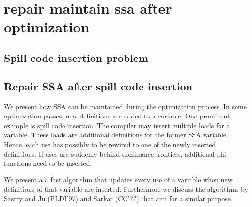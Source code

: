\applynumberofpages\chapter{repair maintain ssa after optimization }

\section{Spill code insertion problem}
\section{Repair SSA after spill code insertion}
We present how SSA can be maintained during the optimization process. 
In some optimization passes, new definitions are added to a variable.
One prominent example is spill code insertion:
The compiler may insert multiple loads for a variable.
These loads are additional definitions for the former SSA variable.
Hence, each use has possibly to be rewired to one of the newly inserted definitions.
If uses are suddenly behind dominance frontiers, additional phi-functions need to be inserted.

We present a a fast algorithm that updates every use of a variable when new definitions of that variable are inserted.
Furthermore we discuss the algorithms by Sastry and Ju (PLDI'97) and Sarkar (CC'??) that aim for a similar purpose.

